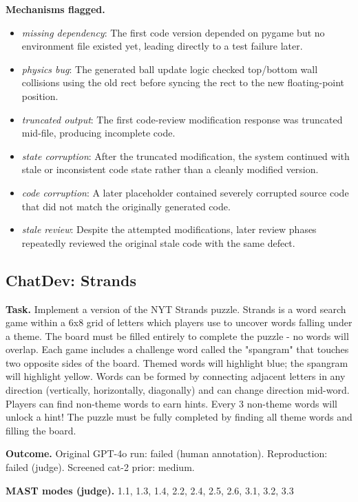 \textbf{Mechanisms flagged.}
\begin{itemize}
  \item \emph{missing dependency}: The first code version depended on pygame but no environment file existed yet, leading directly to a test failure later.
  \item \emph{physics bug}: The generated ball update logic checked top/bottom wall collisions using the old rect before syncing the rect to the new floating-point position.
  \item \emph{truncated output}: The first code-review modification response was truncated mid-file, producing incomplete code.
  \item \emph{state corruption}: After the truncated modification, the system continued with stale or inconsistent code state rather than a cleanly modified version.
  \item \emph{code corruption}: A later placeholder contained severely corrupted source code that did not match the originally generated code.
  \item \emph{stale review}: Despite the attempted modifications, later review phases repeatedly reviewed the original stale code with the same defect.
\end{itemize}

\subsection*{ChatDev: Strands}
\textbf{Task.} Implement a version of the NYT Strands puzzle. Strands is a word search game within a 6x8 grid of letters which players use to uncover words falling under a theme. The board must be filled entirely to complete the puzzle - no words will overlap. Each game includes a challenge word called the "spangram" that touches two opposite sides of the board. Themed words will highlight blue; the spangram will highlight yellow. Words can be formed by connecting adjacent letters in any direction (vertically, horizontally, diagonally) and can change direction mid-word. Players can find non-theme words to earn hints. Every 3 non-theme words will unlock a hint! The puzzle must be fully completed by finding all theme words and filling the board.

\textbf{Outcome.} Original GPT-4o run: failed (human annotation). Reproduction: failed (judge). Screened cat-2 prior: medium.

\textbf{MAST modes (judge).} 1.1, 1.3, 1.4, 2.2, 2.4, 2.5, 2.6, 3.1, 3.2, 3.3

